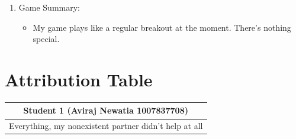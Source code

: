\documentclass{article}
\begin{document}
\begin{enumerate}
\item Game Summary:
\begin{itemize}
\item My game plays like a regular breakout at the moment. There's nothing special.
\end{itemize}

    
\end{enumerate}

\section{Attribution Table}

\begin{center}
\begin{tabular}{|| c ||}
\hline
 Student 1 (Aviraj Newatia 1007837708) \\ 
 \hline
 Everything, my nonexistent partner didn't help at all \\ 
 \hline
\end{tabular}
\end{center}

\end{document}
